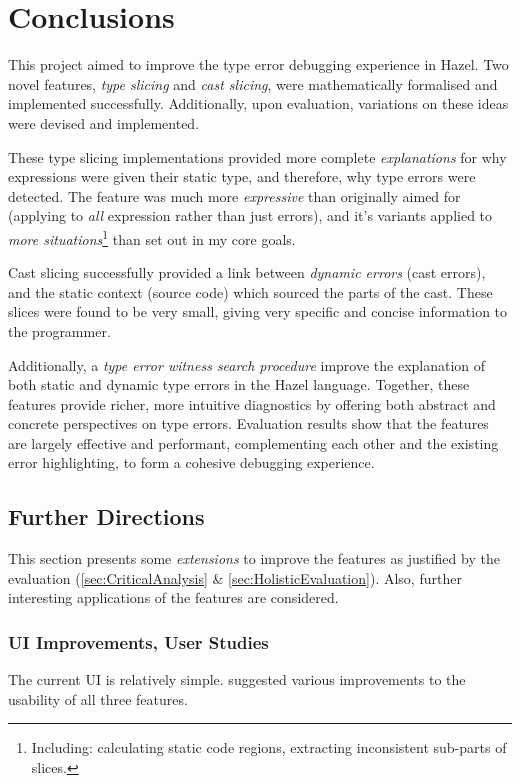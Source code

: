 \chapter{Conclusions}\label{chap:Conclusions}
This project aimed to improve the type error debugging experience in Hazel. Two novel features, \textit{type slicing} and \textit{cast slicing}, were mathematically formalised and implemented successfully. Additionally, upon evaluation, variations on these ideas were devised and implemented. 

These type slicing implementations provided more complete \textit{explanations} for why expressions were given their static type, and therefore, why type errors were detected. The feature was much more \textit{expressive} than originally aimed for (applying to \textit{all} expression rather than just errors), and it's variants applied to \textit{more situations}\footnote{Including: calculating static code regions, extracting inconsistent sub-parts of slices.} than set out in my core goals.

Cast slicing successfully provided a link between \textit{dynamic errors} (cast errors), and the static context (source code) which sourced the parts of the cast. These slices were found to be very small, giving very specific and concise information to the programmer.

Additionally, a \textit{type error witness search procedure}  improve the explanation of both static and dynamic type errors in the Hazel language. Together, these features provide richer, more intuitive diagnostics by offering both abstract and concrete perspectives on type errors. Evaluation results show that the features are largely effective and performant, complementing each other and the existing error highlighting, to form a cohesive debugging experience. 


\section{Further Directions}
This section presents some \textit{extensions} to improve the features as justified by the evaluation (\cref{sec:CriticalAnalysis} \& \ref{sec:HolisticEvaluation}). Also, further interesting {applications} of the features are considered. 

\subsection{UI Improvements, User Studies}
The current UI is relatively simple.  suggested various improvements to the usability of all three features. 

